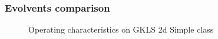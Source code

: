 \documentclass[aspectratio=1610]{beamer}
\begin{document}
\begin{frame}
  \frametitle{Evolvents comparison}
  \begin{figure}[ht]
    \hspace*{-0.9cm}
     \hspace*{4cm}
    \caption{Operating characteristics on GKLS 2d Simple class}
  \end{figure}
\end{frame}
\end{document}
